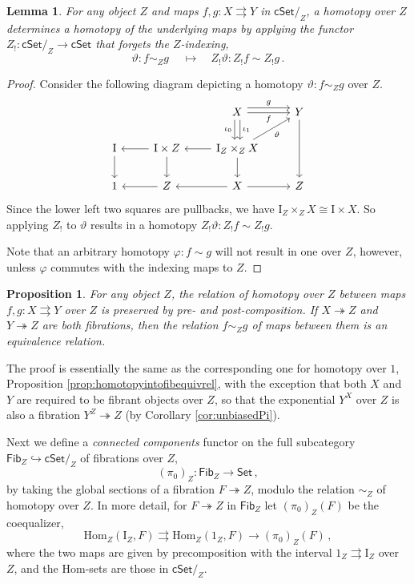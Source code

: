 \documentclass[11pt,reqno]{amsart}
\newcommand{\Set}{\ensuremath{\mathsf{Set}}}
\newcommand{\cSet}{\ensuremath{\mathsf{cSet}}}
\newcommand{\cSetZ}{\ensuremath{\mathsf{cSet}/_{\!Z}}}
\newcommand{\hook}{\ensuremath{\hookrightarrow}}
\newcommand{\ra}{\ensuremath{\rightarrow}}
\newcommand{\fib}{\ensuremath{\twoheadrightarrow}}
\renewcommand{\to}{\ensuremath{\rightarrow}}
\newcommand{\Hom}{\ensuremath{\mathrm{Hom}}}
\renewcommand{\hom}{\ensuremath{\mathrm{Hom}}}
\newcommand{\I}{\ensuremath{\mathrm{I}}}
\newcommand{\Fib}{\ensuremath{\mathsf{Fib}}}
\newtheorem{proposition}[theorem]{Proposition}
\newtheorem{lemma}[theorem]{Lemma}
\theoremstyle{remark}
\theoremstyle{definition}
\begin{document}
\begin{lemma}\label{lem:homotopyinthesliceishomotopy}
For any object $Z$ and maps $f, g: X\rightrightarrows Y$ in $\cSetZ$, a homotopy over $Z$ determines a homotopy of the underlying maps by applying the functor $Z_! : \cSetZ \to \cSet$ that forgets the $Z$-indexing,
\[
\vartheta : f\sim_Z g \quad\ \mapsto\quad  Z_! \vartheta : Z_! f\sim Z_! g\,.
\]
\end{lemma}
\begin{proof} 
 Consider the following diagram depicting a homotopy $\vartheta : f\sim_Z g$ over $Z$. 
\[\begin{tikzcd}
&& X  \ar[d, shift left, "\iota_1"] \ar[d, shift right, swap,  "\iota_0"] \ar[r,swap, "f"] \ar[r, shift left=1ex, "g"] & Y \ar[dd] \\  
\I \ar[d]  & \ar[l]  \I \times Z \ar[d] &  \ar[l]   \I_Z \times_Z X  \ar[d] \ar[ru,swap, "\vartheta"] &  \\
1 & Z\ar[l] & \ar[l] X  \ar[r] & Z
 \end{tikzcd}\]
 Since the lower left two squares are pullbacks, we have $\I_Z \times_Z X \cong \I\times X$. So applying $Z_!$ to $\vartheta$ results in a homotopy $Z_!\vartheta : Z_! f \sim Z_!g$.
 
Note that an arbitrary homotopy $\varphi : f \sim  g$ will not result in one over $Z$, however, unless $\varphi$ commutes with the indexing maps to $Z$.
\end{proof}

\begin{proposition}\label{prop:homotopybetweenfibequivrel}
For any object $Z$, the relation of homotopy over $Z$ between maps $f, g: X\rightrightarrows Y$ over $Z$ is preserved by pre- and post-composition. If $X\fib Z$ and $Y\fib Z$ are both fibrations, then the relation $f \sim_Z g$ of maps between them is an equivalence relation.
\end{proposition}

The proof is essentially the same as the corresponding one for homotopy over $1$, Proposition \ref{prop:homotopyintofibequivrel}, with the exception that both $X$ and $Y$ are required to be fibrant objects over $Z$, so that the exponential $Y^X$ over $Z$ is also a fibration $Y^Z  \fib Z$ (by Corollary \ref{cor:unbiasedPi}).

Next we define a \emph{connected components} functor on the full subcategory $\Fib_Z \hook \cSetZ$ of fibrations over $Z$,
\[
(\pi_0)_Z : \Fib_Z \ra\Set\,,
\]
by taking the global sections of a fibration $F\fib Z$, modulo the relation $\sim_Z$ of homotopy over $Z$. In more detail,  for $F\fib Z$ in $\Fib_Z$ let $(\pi_0)_Z(F)$ be the coequalizer,
\begin{equation}\label{eq:coeqpi0}
\Hom_Z(\I_Z , F) \rightrightarrows \Hom_Z(1_Z , F) \to (\pi_0)_Z(F) \,,
\end{equation}
where the two maps are given by precomposition with the interval $1_Z \rightrightarrows \I_Z$ over $Z$, and the $\hom$-sets are those in $\cSetZ$.
\end{document}
